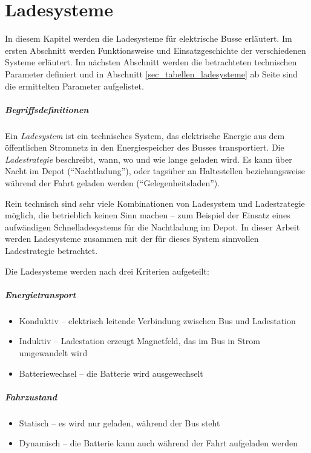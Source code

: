 \chapter{Ladesysteme}
In diesem Kapitel werden die Ladesysteme für elektrische Busse erläutert. Im ersten Abschnitt werden Funktionsweise und Einsatzgeschichte der verschiedenen Systeme erläutert. Im nächsten Abschnitt werden die betrachteten technischen Parameter definiert und in Abschnitt \ref{sec_tabellen_ladesysteme} ab Seite \pageref{sec_tabellen_ladesysteme} sind die ermittelten Parameter aufgelistet.

\paragraph{Begriffsdefinitionen}
Ein \emph{Ladesystem} ist ein technisches System, das elektrische Energie aus dem öffentlichen Stromnetz in den Energiespeicher des Busses transportiert. Die \emph{Ladestrategie} beschreibt, wann, wo und wie lange geladen wird. Es kann über Nacht im Depot ("`Nachtladung"'), oder tagsüber an Haltestellen beziehungsweise während der Fahrt geladen werden ("`Gelegenheitsladen"'). 

Rein technisch sind sehr viele Kombinationen von Ladesystem und Ladestrategie möglich, die betrieblich keinen Sinn machen – zum Beispiel der Einsatz eines aufwändigen Schnelladesystems für die Nachtladung im Depot. In dieser Arbeit werden Ladesysteme zusammen mit der für dieses System sinnvollen Ladestrategie betrachtet.

Die Ladesysteme werden nach drei Kriterien aufgeteilt:

\paragraph{Energietransport}
\begin{itemize}
	\item Konduktiv – elektrisch leitende Verbindung zwischen Bus und Ladestation
	\item Induktiv – Ladestation erzeugt Magnetfeld, das im Bus in Strom umgewandelt wird
	\item Batteriewechsel – die Batterie wird ausgewechselt
\end{itemize}

\paragraph{Fahrzustand}
\begin{itemize}
	\item Statisch – es wird nur geladen, während der Bus steht
	\item Dynamisch – die Batterie kann auch während der Fahrt aufgeladen werden
\end{itemize}


